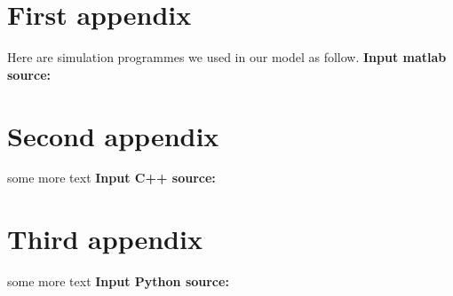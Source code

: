 \documentclass[12pt]{article}
\begin{document}
\newpage

\appendix %
\appendixpage %
\addappheadtotoc %

\section{First appendix}

Here are simulation programmes we used in our model as follow.
\textbf{\textcolor[rgb]{0.98,0.00,0.00}{Input matlab source:}}


\section{Second appendix}
some more text \textcolor[rgb]{0.98,0.00,0.00}{\textbf{Input C++ source:}}


\section{Third appendix}
some more text \textcolor[rgb]{0.98,0.00,0.00}{\textbf{Input Python source:}}

\end{document}
